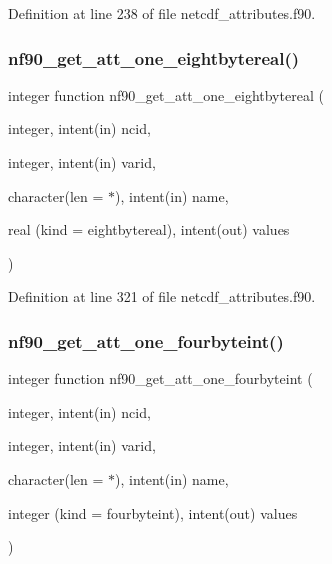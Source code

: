 Definition at line 238 of file netcdf\+\_\+attributes.\+f90.

\mbox{\label{netcdf__attributes_8f90_a6149e70bb700cb94ea5f140a3035edfa}} 
\subsubsection{\texorpdfstring{nf90\+\_\+get\+\_\+att\+\_\+one\+\_\+eightbytereal()}{nf90\_get\_att\_one\_eightbytereal()}}
{\footnotesize\ttfamily integer function nf90\+\_\+get\+\_\+att\+\_\+one\+\_\+eightbytereal (\begin{DoxyParamCaption}\item[{integer, intent(in)}]{ncid,  }\item[{integer, intent(in)}]{varid,  }\item[{character(len = $\ast$), intent(in)}]{name,  }\item[{real (kind = eightbytereal), intent(out)}]{values }\end{DoxyParamCaption})}



Definition at line 321 of file netcdf\+\_\+attributes.\+f90.

\mbox{\label{netcdf__attributes_8f90_a7e77199a9f60a1292d57185893fcc5e8}} 
\subsubsection{\texorpdfstring{nf90\+\_\+get\+\_\+att\+\_\+one\+\_\+fourbyteint()}{nf90\_get\_att\_one\_fourbyteint()}}
{\footnotesize\ttfamily integer function nf90\+\_\+get\+\_\+att\+\_\+one\+\_\+fourbyteint (\begin{DoxyParamCaption}\item[{integer, intent(in)}]{ncid,  }\item[{integer, intent(in)}]{varid,  }\item[{character(len = $\ast$), intent(in)}]{name,  }\item[{integer (kind = fourbyteint), intent(out)}]{values }\end{DoxyParamCaption})}



